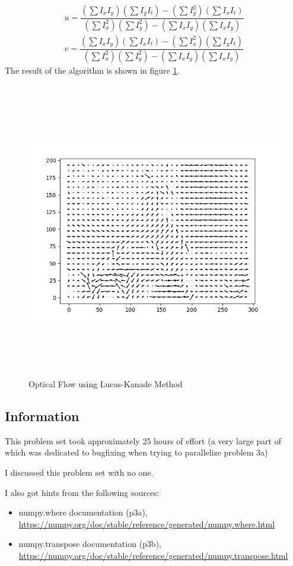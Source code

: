 \documentclass{article}
\newcommand{\info}{\clearpage \subsection*{Information}}
\begin{document}
\begin{align}
	 u = \dfrac{\left(\sum I_xI_y\right)\left(\sum I_y I_t\right) - \left(\sum I_y^2\right)\left(\sum I_x I_t\right)}{\left(\sum I_x^2\right)\left(\sum I_y^2\right)-\left(\sum I_xI_y\right)\left(\sum I_xI_y\right)} \\
	 v = \dfrac{\left(\sum I_xI_y\right)\left(\sum I_x I_t\right) - \left(\sum I_x^2\right)\left(\sum I_y I_t\right)}{\left(\sum I_x^2\right)\left(\sum I_y^2\right)-\left(\sum I_xI_y\right)\left(\sum I_xI_y\right)}
\end{align}
The result of the algorithm is shown in figure \ref{fig:p4}.
\begin{figure}[!h]
	\centering
	\includegraphics[height=35em]{prob4}
	\caption{Optical Flow using Lucas-Kanade Method}
	\label{fig:p4}
\end{figure}


\info

This problem set took approximately 25 hours of effort (a very large part of which was dedicated to bugfixing when trying to parallelize problem 3a)

I discussed this problem set with no one.

I also got hints from the following sources:
\begin{itemize}
	\item numpy.where documentation (p3a), \url{https://numpy.org/doc/stable/reference/generated/numpy.where.html}
	\item numpy.transpose documentation (p3b), \url{https://numpy.org/doc/stable/reference/generated/numpy.transpose.html}
\end{itemize}
\end{document}
